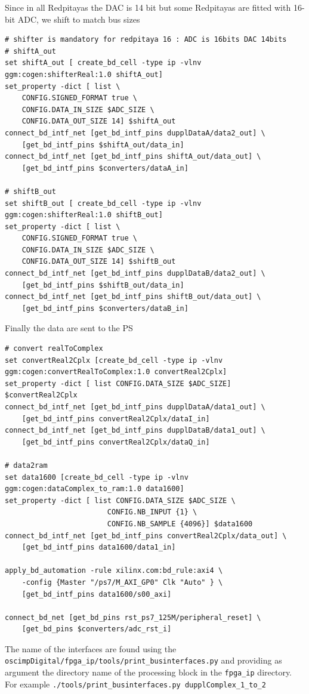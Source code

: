 \documentclass[12pt,oneside]{article}
\begin{document}
Since in all Redpitayas the DAC is 14 bit but some Redpitayas are fitted with 16-bit ADC,
we shift to match bus sizes
{\footnotesize
\begin{verbatim}
# shifter is mandatory for redpitaya 16 : ADC is 16bits DAC 14bits
# shiftA_out
set shiftA_out [ create_bd_cell -type ip -vlnv ggm:cogen:shifterReal:1.0 shiftA_out]
set_property -dict [ list \
	CONFIG.SIGNED_FORMAT true \
	CONFIG.DATA_IN_SIZE $ADC_SIZE \
	CONFIG.DATA_OUT_SIZE 14] $shiftA_out
connect_bd_intf_net [get_bd_intf_pins dupplDataA/data2_out] \
	[get_bd_intf_pins $shiftA_out/data_in]
connect_bd_intf_net [get_bd_intf_pins shiftA_out/data_out] \
	[get_bd_intf_pins $converters/dataA_in]

# shiftB_out
set shiftB_out [ create_bd_cell -type ip -vlnv ggm:cogen:shifterReal:1.0 shiftB_out]
set_property -dict [ list \
	CONFIG.SIGNED_FORMAT true \
	CONFIG.DATA_IN_SIZE $ADC_SIZE \
	CONFIG.DATA_OUT_SIZE 14] $shiftB_out
connect_bd_intf_net [get_bd_intf_pins dupplDataB/data2_out] \
	[get_bd_intf_pins $shiftB_out/data_in]
connect_bd_intf_net [get_bd_intf_pins shiftB_out/data_out] \
	[get_bd_intf_pins $converters/dataB_in]
\end{verbatim}
}

Finally the data are sent to the PS
{\footnotesize
\begin{verbatim}
# convert realToComplex
set convertReal2Cplx [create_bd_cell -type ip -vlnv ggm:cogen:convertRealToComplex:1.0 convertReal2Cplx]
set_property -dict [ list CONFIG.DATA_SIZE $ADC_SIZE] $convertReal2Cplx
connect_bd_intf_net [get_bd_intf_pins dupplDataA/data1_out] \
	[get_bd_intf_pins convertReal2Cplx/dataI_in]
connect_bd_intf_net [get_bd_intf_pins dupplDataB/data1_out] \
	[get_bd_intf_pins convertReal2Cplx/dataQ_in]

# data2ram
set data1600 [create_bd_cell -type ip -vlnv ggm:cogen:dataComplex_to_ram:1.0 data1600]
set_property -dict [ list CONFIG.DATA_SIZE $ADC_SIZE \
						CONFIG.NB_INPUT {1} \
						CONFIG.NB_SAMPLE {4096}] $data1600
connect_bd_intf_net [get_bd_intf_pins convertReal2Cplx/data_out] \
	[get_bd_intf_pins data1600/data1_in]

apply_bd_automation -rule xilinx.com:bd_rule:axi4 \
    -config {Master "/ps7/M_AXI_GP0" Clk "Auto" } \
    [get_bd_intf_pins data1600/s00_axi]

connect_bd_net [get_bd_pins rst_ps7_125M/peripheral_reset] \
	[get_bd_pins $converters/adc_rst_i]
\end{verbatim}
}

The name of the interfaces are found using the {\tt oscimpDigital/fpga\_ip/tools/print\_businterfaces.py} and providing
as argument the directory name of the processing block in the {\tt fpga\_ip} directory. For example
{\tt ./tools/print\_businterfaces.py dupplComplex\_1\_to\_2}
\end{document}
